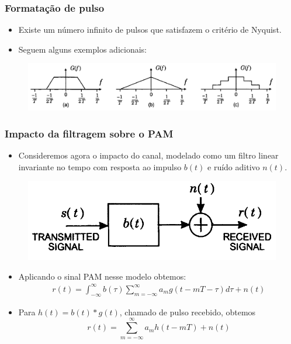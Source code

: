\begin{frame}
	\frametitle{Formatação de pulso}

	\begin{itemize}
	    \item Existe um número infinito de pulsos que satisfazem o critério de Nyquist.
	    \item Seguem alguns exemplos adicionais:
	\end{itemize}	
	\begin{figure}[t]	
	  \begin{center}
	    \includegraphics[width=0.8\columnwidth]{figs/pam_07}
	  \end{center}
	\end{figure}
\end{frame}

\begin{frame}
	\frametitle{Impacto da filtragem sobre o PAM}

	\begin{itemize}
	    \item Consideremos agora o impacto do canal, modelado como um filtro linear invariante no tempo com resposta ao impulso $b(t)$ e ruído aditivo $n(t)$.
	\end{itemize}	
	\begin{figure}[t]	
	  \begin{center}
	    \includegraphics[width=0.4\columnwidth]{figs/pam_08}
	  \end{center}
	\end{figure}
	\begin{itemize}
	    \item Aplicando o sinal PAM nesse modelo obtemos:
	    \begin{align*}
		r(t) = \int_{-\infty}^{\infty}b(\tau)\sum\limits_{m=-\infty}^{\infty} a_m g(t-mT-\tau)d\tau + n(t)
	    \end{align*}
	    \item Para $h(t) = b(t)*g(t)$, chamado de pulso recebido, obtemos
	    \begin{equation*}
		r(t) = \sum\limits_{m=-\infty}^{\infty} a_m h(t-mT) + n(t)
	    \end{equation*}
	\end{itemize}	
\end{frame}

